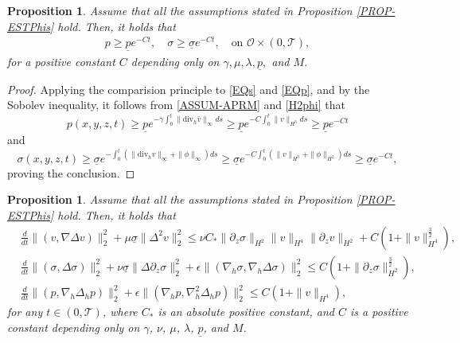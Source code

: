\documentclass[12pt,reqno]{amsart}
\numberwithin{equation}{section}
\newtheorem{proposition}[theorem]{Proposition}
\begin{document}
\begin{proposition}
  \label{PROP-LBsp-UnderM}
Assume that all the assumptions stated in Proposition \ref{PROP-ESTPhis} hold. Then, it holds that
\begin{align*}
p\geq\underline pe^{-Ct},\quad \sigma\geq\underline\sigma e^{-Ct}, \quad\mbox{on }\mathcal O\times(0,\mathcal T),
\end{align*}
for a positive constant $C$ depending only on $\gamma, \mu, \lambda, \underline p,$ and $M$.
\end{proposition}

\begin{proof}
Applying the comparision principle to \eqref{EQs} and \eqref{EQp}, and by the Sobolev inequality, it follows from \eqref{ASSUM-APRM} and \eqref{H2phi} that
$$
  p(x,y,z,t)\geq\underline pe^{-\gamma\int_0^t\|\text{div}_h\bar v\|_\infty ds}\geq\underline pe^{- C\int_0^t\|v\|_{H^3}ds}\geq\underline pe^{-Ct}
$$
and
$$
  \sigma(x,y,z,t)\geq\underline\sigma e^{-\int_0^t(\|\text{div}_hv\|_\infty+\|\phi\|_\infty)ds}\geq\underline\sigma e^{-C\int_0^t(\|v\|_{H^3}+\|\phi\|_{H^2})ds}\geq \underline\sigma e^{-Ct},
$$
proving the conclusion.
\end{proof}

\begin{proposition}
\label{PROP-EGYINEQT}
Assume that all the assumptions stated in Proposition \ref{PROP-ESTPhis} hold. Then, it holds that
\begin{align*}
  &\frac{d}{dt}\|(v,\nabla\Delta v)\|_2^2+\mu\underline\sigma\|\Delta^2v\|_2^2
  \leq \nu C_*\|\partial_z\sigma\|_{H^2}\|v\|_{H^4}\|\partial_zv\|_{H^2}+C\left(1+\|v\|_{H^4}^\frac32\right),\\
  &\frac{d}{dt}\|(\sigma,\Delta\sigma)\|_2^2+\nu\underline\sigma\|\Delta\partial_z\sigma\|_2^2
  +\epsilon\|(\nabla_h\sigma,\nabla_h\Delta\sigma)\|_2^2
  \leq C\left(1+\|\partial_z\sigma\|_{H^2}^\frac32\right),\\
  &\frac{d}{dt}\|(p,\nabla_h\Delta_hp)\|_2^2+\epsilon\|(\nabla_hp,\nabla_h^2\Delta_hp)\|_2^2\leq C\left(1+\|v\|_{H^4}\right),
\end{align*}
for any $t\in(0,\mathcal T)$,
where $C_*$ is an absolute positive constant, and $C$ is a positive constant depending only on $\gamma$, $\nu$, $\mu$,
$\lambda$, $\underline p$, and $M$.
\end{proposition}
\end{document}
